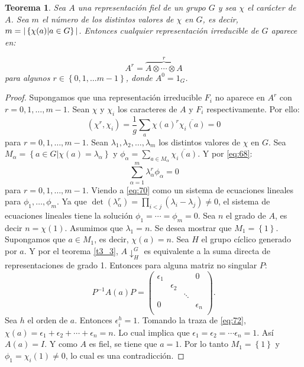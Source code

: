 \documentclass[12pt]{book}
\newtheorem{theorem}{Teorema}[section]
\theoremstyle{definition}
\newcounter{in}
\begin{document}
\begin{theorem}
  \label{t6_3}
  Sea $A$ una representación fiel de un grupo $G$ y sea $\chi$ el
  carácter de $A$. Sea $m$ el número de los distintos valores de
  $\chi$ en $G$, es
  decir,~$m = |\left\{ \chi(a) \arrowvert a \in G \right\}
  |$. Entonces cualquier representación irreducible de $G$ aparece en:

  \begin{equation*}
    A^{r}=  \overbrace{A \otimes \cdots \otimes A}^{r}
  \end{equation*}
  para algunos $r \in \left\{ 0, 1, \ldots m-1 \right\}$, donde $A^{0}=1_{G}$.
\end{theorem}
\begin{proof}
  Supongamos que una representación irreducible $F_{i}$ no aparece en
  $A^{r}$ con $r=0,1,\ldots,m-1$. Sean $\chi$ y $\chi_{i}$ los
  caracteres de $A$ y $F_{i}$ respectivamente. Por ello:
  \begin{equation}
    \label{eq:68}
    (\chi^{r},\chi_{i}) = \frac{1}{g} \sum_{a} \chi(a)^{r} \overline{\chi_{i}(a)}=0
  \end{equation}
  para $r=0,1, \ldots, m-1$. Sean
  $\lambda_{1}, \lambda_{2}, \ldots, \lambda_{m}$ los distintos valores
  de $\chi$ en $G$. Sea
  $M_{\alpha}=\left\{ a \in G | \chi(a)=\lambda_{\alpha} \right\}$ y
  $\phi_{\alpha}= \sum_{a \in M_{\alpha}} \overline{\chi_{i}(a)}$. Y por \ref{eq:68}:
  \begin{equation}
    \label{eq:70}
    \sum_{\alpha=1}^{m} \lambda_{\alpha}^{r} \phi_{\alpha} =0
  \end{equation}
  para $r=0,1, \ldots,m-1$. Viendo a \ref{eq:70} como un sistema de
  ecuaciones lineales para $\phi_{1}, \ldots, \phi_{m}$. Ya que
  $\det (\lambda_{\alpha}^{r}) = \prod_{i<j} (\lambda_{i}-\lambda_{j})
  \neq 0$, el sistema de ecuaciones lineales tiene la solución
  $\phi_{1}= \cdots= \phi_{m}=0$.  Sea $n$ el grado de $A$, es decir
  $n=\chi(1)$. Asumimos que $\lambda_{1}=n$. Se desea mostrar que
  $M_{1}=\left\{ 1 \right\}$. Supongamos que $a \in M_{1}$, es decir,
  $\chi(a)=n$. Sea $H$ el grupo cíclico generado por $a$. Y por el
  teorema \ref{t3_3}, $A\downarrow^{G}_{H}$ es equivalente a la suma directa de
  representaciones de grado 1. Entonces para alguna matriz no singular
  $P$:
  \begin{equation}
    \label{eq:72}
    P^{-1}A(a)P=
    \begin{pmatrix}
      \epsilon_{1} & & & 0 \\ 
      & \epsilon_{2} & & \\
      & & \ddots & \\
      0 & & & \epsilon_{n}\\
    \end{pmatrix}
    .
  \end{equation}
  Sea $h$ el orden de $a$. Entonces $\epsilon_{i}^{h}=1$. Tomando la
  traza de \ref{eq:72},
  $\chi(a) = \epsilon_{1} + \epsilon_{2} + \cdots +
  \epsilon_{n}=n$. Lo cual implica que
  $\epsilon_{1}=\epsilon_{2}= \cdots \epsilon_{n}=1$. Así $A(a)=I$. Y
  como $A$ es fiel, se tiene que $a=1$. Por lo tanto
  $M_{1}=\left\{ 1 \right\}$ y $\phi_{1}= \chi_{i}(1) \neq 0$, lo cual
  es una contradicción.
\end{proof}
\end{document}
